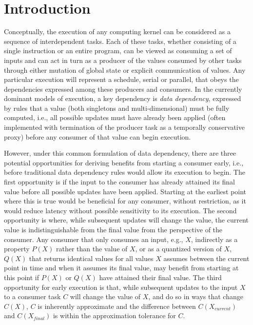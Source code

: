
\section{Introduction}
Conceptually, the execution of any computing kernel can be considered as a sequence of interdependent tasks.  Each of these tasks, whether consisting of a single instruction or an entire program, can be viewed as consuming a set of inputs and can act in turn as a producer of the values consumed by other tasks through either mutation of global state or explicit communication of values.  Any particular execution will represent a schedule, serial or parallel, that obeys the dependencies expressed among these producers and consumers.  In the currently dominant models of execution, a key dependency is \emph{data dependency}, expressed by rules that a value (both singletons and multi-dimensional) must be fully computed, i.e., all possible updates must have already been applied (often implemented with termination of the producer task as a temporally conservative proxy) before any consumer of that value can begin execution.

However, under this common formulation of data dependency, there are three potential opportunities for deriving benefits from starting a consumer early, i.e., before traditional data dependency rules would allow its execution to begin. The first opportunity is if the input to the consumer has already attained its final value before all possible updates have been applied. Starting at the earliest point where this is true would be beneficial for any consumer, without restriction, as it would reduce latency without possible sensitivity to its execution. The second opportunity is where, while subsequent updates will change the value, the current value is indistinguishable from the final value from the perspective of the consumer. Any consumer that only consumes an input, e.g., $X$, indirectly as a property $P(X)$ rather than the value of $X$, or as a quantized version of $X$, $Q(X)$ that returns identical values for all values $X$ assumes between the current point in time and when it assumes its final value, may benefit from starting at this point if $P(X)$ or $Q(X)$ have attained their final value. The third opportunity for early execution is that, while subsequent updates to the input $X$ to a consumer task $C$ will change the value of $X$, and do so in ways that change $C(X)$, $C$ is inherently approximate and the difference between $C(X_{current})$ and $C(X_{final})$ is within the approximation tolerance for $C$.

